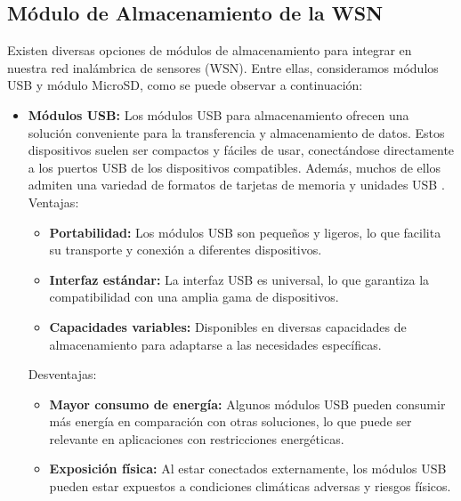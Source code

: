 \subsection{Módulo de Almacenamiento de la WSN}
Existen diversas opciones de módulos de almacenamiento para integrar en nuestra red inalámbrica de sensores (WSN). Entre ellas, consideramos módulos USB y módulo MicroSD, como se puede observar a continuación:
\begin{itemize}
\item \textbf{Módulos USB:} Los módulos USB para almacenamiento ofrecen una solución conveniente para la transferencia y almacenamiento de datos. Estos dispositivos suelen ser compactos y fáciles de usar, conectándose directamente a los puertos USB de los dispositivos compatibles. Además, muchos de ellos admiten una variedad de formatos de tarjetas de memoria y unidades USB \cite{usb}.\\
Ventajas:	
\begin{itemize}[label=o]
\item \textbf{Portabilidad:} Los módulos USB son pequeños y ligeros, lo que facilita su transporte y conexión a diferentes dispositivos.
\item \textbf{Interfaz estándar:} La interfaz USB es universal, lo que garantiza la compatibilidad con una amplia gama de dispositivos.
\item \textbf{Capacidades variables:} Disponibles en diversas capacidades de almacenamiento para adaptarse a las necesidades específicas.
\end{itemize}
Desventajas:
\begin{itemize}[label=o]
\item \textbf{Mayor consumo de energía:} Algunos módulos USB pueden consumir más energía en comparación con otras soluciones, lo que puede ser relevante en aplicaciones con restricciones energéticas.
\item \textbf{Exposición física:} Al estar conectados externamente, los módulos USB pueden estar expuestos a condiciones climáticas adversas y riesgos físicos.
\end{itemize}


\end{itemize}
